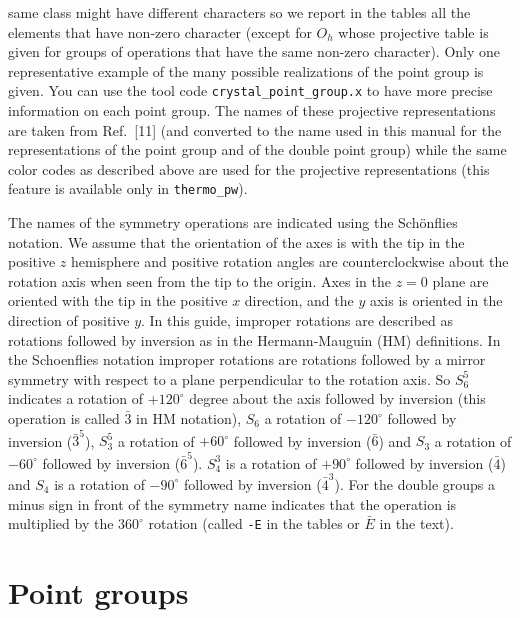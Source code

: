 \documentclass[12pt,a4paper]{article}
\begin{document}
same class might have different characters so we report in the tables all 
the elements that have non-zero character (except for $O_h$ whose
projective table is given for groups of operations that have the same
non-zero character). 
Only one representative example of the many possible realizations of 
the point group is given. You can use the tool code 
\texttt{crystal\_point\_group.x} to have more precise information
on each point group. The names 
of these projective representations are taken from Ref.~[11] (and converted
to the name used in this manual for the representations of the point group 
and of the double point group) while the same color codes as described above 
are used for the projective representations (this feature is available
only in \texttt{thermo\_pw}).

The names of the symmetry operations are indicated using
the Sch\"onflies notation. 
We assume that the orientation of the axes is with the tip in the positive
$z$ hemisphere and positive rotation angles are counterclockwise about 
the rotation axis when seen from the tip to the origin. Axes in the $z=0$ 
plane are oriented with the tip in the
positive $x$ direction, and the $y$ axis is oriented in the 
direction of positive $y$. In this guide, improper rotations are described 
as rotations followed by inversion as in the Hermann-Mauguin (HM) 
definitions. In the Schoenflies notation improper rotations are rotations
followed by a mirror symmetry with respect to a plane perpendicular to 
the rotation axis.
So $S_6^5$ indicates a rotation of $+120^\circ$ degree about the axis 
followed by inversion (this operation is called $\bar 3$ in 
HM notation), $S_6$ a rotation of 
$-120^\circ$ followed by inversion ($\bar 3^5$), $S_3^5$ a rotation 
of $+60^\circ$ followed by inversion ($\bar 6$) and
$S_3$ a rotation of $-60^\circ$ followed by inversion ($\bar 6^5$).
$S_4^3$ is a rotation of $+90^\circ$ followed by inversion ($\bar 4$) and
$S_4$ is a rotation of $-90^\circ$ followed by inversion ($\bar 4^3$).
For the double groups a minus sign in front of the symmetry name
indicates that the operation is multiplied by the $360^\circ$ rotation 
(called \texttt{-E} in the tables or $\bar E$ in the text).

\newpage
\section{\color{coral}Point groups}
\end{document}
